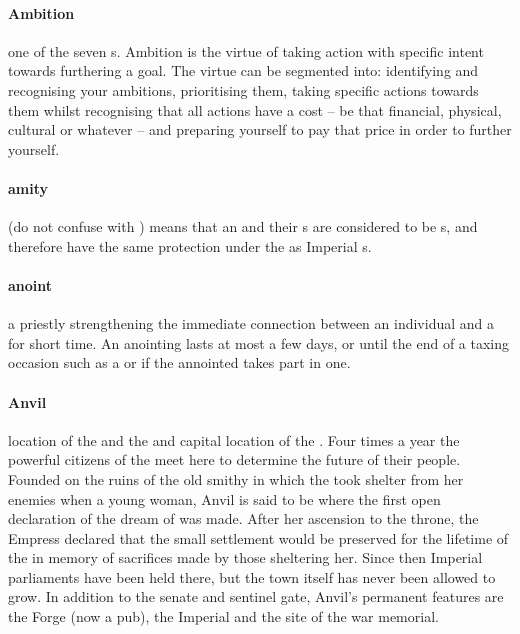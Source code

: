 \paragraph{Ambition} one of the seven s. Ambition is the virtue of taking action with specific intent towards furthering a goal. The virtue can be segmented into: identifying and recognising your ambitions, prioritising them, taking specific actions towards them whilst recognising that all actions have a cost – be that financial, physical, cultural or whatever – and preparing yourself to pay that price in order to further yourself.
\paragraph{amity} (do not confuse with ) means that an  and their s are considered to be s, and therefore have the same protection under the  as Imperial s.
\paragraph{anoint} a priestly  strengthening the immediate connection between an individual and a  for short time. An anointing lasts at most a few days, or until the end of a taxing occasion such as a  or  if the annointed takes part in one.
\paragraph{Anvil} location of the  and the  and capital location of the . Four times a year the powerful citizens of the  meet here to determine the future of their people. Founded on the ruins of the old smithy in which the  took shelter from her enemies when a young woman, Anvil is said to be where the first open declaration of the dream of  was made. \localpar After her ascension to the throne, the Empress declared that the small settlement would be preserved for the lifetime of the  in memory of sacrifices made by those sheltering her. Since then Imperial parliaments have been held there, but the town itself has never been allowed to grow. In addition to the senate and sentinel gate, Anvil's permanent features are the Forge (now a pub), the Imperial  and the site of the war memorial.%

